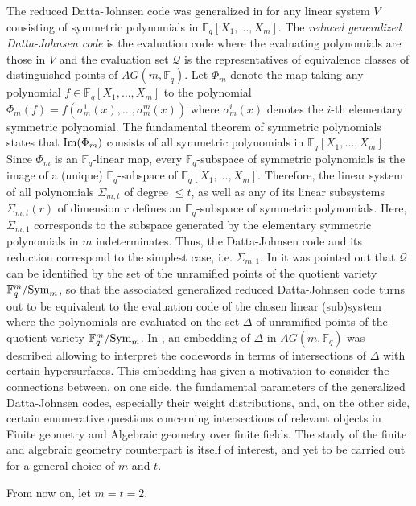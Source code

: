 \documentclass[sn-mathphys-num]{sn-jnl}%
\begin{document}
The reduced Datta-Johnsen code was generalized in \cite{GKNPS} for  any linear system $V$ consisting of symmetric polynomials in $\mathbb{F}_q[X_1,\ldots,X_m]$. The {\emph{reduced generalized Datta-Johnsen code}} is the evaluation code where the evaluating polynomials are those in $V$ and the evaluation set $\mathcal{Q}$ is the representatives of equivalence classes of distinguished points of $AG(m,\mathbb{F}_q)$. Let  $\Phi_m$ denote the map taking any polynomial $f\in\mathbb{F}_q[X_1,\ldots,X_m]$ to the polynomial $\Phi_m(f)=f(\sigma_m^1(x),\dots,\sigma_m^m(x))$  where $\sigma_m^i(x)$ denotes the $i$-th elementary symmetric polynomial. The fundamental theorem of symmetric polynomials states that
${\rm{Im}}(\Phi_m)$ consists of all symmetric polynomials in $\mathbb{F}_q[X_1,\ldots,X_m]$.
Since $\Phi_m$ is an $\mathbb{F}_q$-linear map, every $\mathbb{F}_q$-subspace of symmetric polynomials is the image of a (unique) $\mathbb{F}_q$-subspace of $\mathbb{F}_q[X_1,\ldots,X_m]$. Therefore,
 the linear system of all polynomials $\Sigma_{m,t}$ of degree $\le t$, as well as any of its linear subsystems $\Sigma_{m,t}(r)$ of dimension $r$  defines an $\mathbb{F}_q$-subspace of symmetric polynomials. Here, $\Sigma_{m,1}$ corresponds to the subspace generated by the elementary symmetric polynomials in $m$ indeterminates. Thus, the Datta-Johnsen code and its reduction correspond to the simplest case, i.e. $\Sigma_{m,1}$. In \cite{GKNPS} it was pointed out that $\mathcal{Q}$ can be identified by the set of the unramified points of the quotient variety $\mathbb{F}_q^m/{\rm{Sym}}_m$, so that the associated generalized reduced Datta-Johnsen code turns out to be equivalent to the evaluation code of the chosen linear (sub)system where the polynomials are evaluated on the set $\Delta$ of unramified points of the quotient variety $\mathbb{F}_q^m/{\rm{Sym}}_m$. In \cite{GKNPS}, an embedding of $\Delta$ in $AG(m,\mathbb{F}_q)$ was described allowing to interpret the codewords in terms of intersections of $\Delta$ with certain hypersurfaces. This embedding  has given a motivation to consider the connections between, on one side, the fundamental parameters of the generalized Datta-Johnsen codes, especially their weight distributions, and, on the other side, certain enumerative questions concerning intersections of relevant objects in Finite geometry and Algebraic geometry over finite fields. The study of the finite and algebraic geometry counterpart is itself of interest, and yet to be carried out for a general choice of $m$ and $t$.

 From now on, let $m=t=2$.
\end{document}
